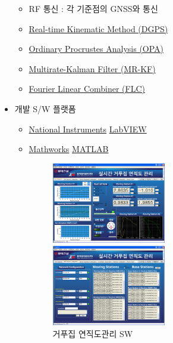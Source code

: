 \documentclass[10pt,a4paper,ragged2e]{altacv}
\begin{document}
\begin{fullwidth}
\begin{itemize}
\begin{itemize}
			      \item RF 통신 : 각 기준점의 GNSS와 통신
			      \item \href{https://en.wikipedia.org/wiki/Differential_GPS}{Real-time Kinematic Method (DGPS)}
			      \item \href{https://en.wikipedia.org/wiki/Procrustes_analysis}{Ordinary Procrustes Analysis (OPA)}
			      \item \href{http://scholar.lib.vt.edu/theses/available/etd-062899-064821/unrestricted/etd.PDF}{Multirate-Kalman  Filter (MR-KF)}
			      \item \href{http://ieeexplore.ieee.org/xpl/login.jsp?tp=\&arnumber=258116\&url=http\%3A\%2F\%2Fieeexplore.ieee.org\%2Fxpls\%2Fabs_all.jsp\%3Farnumber\%3D258116}{Fourier Linear Combiner (FLC)}
		      \end{itemize}
		\item 개발 S/W 플랫폼
		      \begin{itemize}
			      \item \href{https://en.wikipedia.org/wiki/National_Instruments}{National Instruments} \href{https://en.wikipedia.org/wiki/LabVIEW}{LabVIEW}
			      \item \href{https://en.wikipedia.org/wiki/MathWorks}{Mathworks} \href{https://en.wikipedia.org/wiki/MATLAB}{MATLAB}
			            \begin{figure}[ht]
				            \begin{fullwidth}
					            \centering
					            \parbox{0.5\textwidth}{
						            \includegraphics[width=0.5\textwidth] {images/gps_01.png}
						            \caption*{거푸집 연직도관리 SW}
					            }\qquad
					            \parbox{0.5\textwidth}{
						            \includegraphics[width=0.5\textwidth] {images/gps_02.png}
}
\end{fullwidth}
\end{figure}
\end{itemize}
\end{itemize}
\end{fullwidth}
\end{document}
